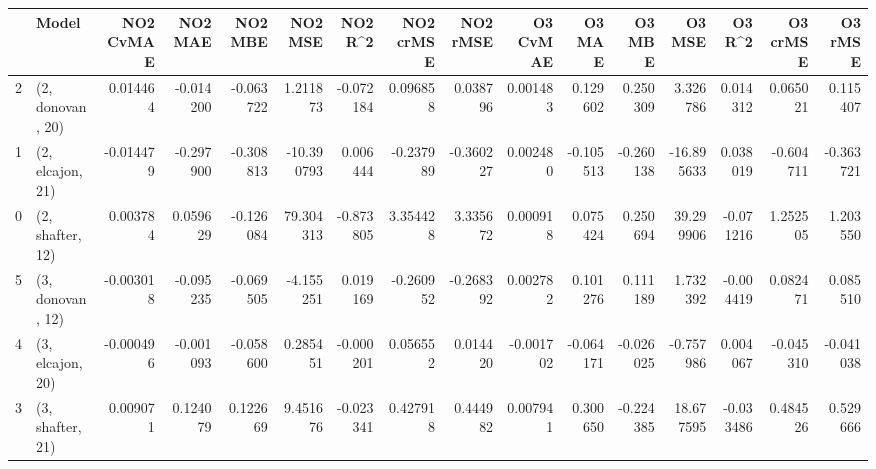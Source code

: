 \begin{tabular}{llrrrrrrrrrrrrrr}
\toprule
{} &             Model &  NO2 CvMAE &   NO2 MAE &   NO2 MBE &    NO2 MSE &   NO2 R\textasciicircum2 &  NO2 crMSE &  NO2 rMSE &  O3 CvMAE &    O3 MAE &    O3 MBE &     O3 MSE &    O3 R\textasciicircum2 &  O3 crMSE &   O3 rMSE \\
\midrule
2 &  (2, donovan, 20) &   0.014464 & -0.014200 & -0.063722 &   1.211873 & -0.072184 &   0.096858 &  0.038796 &  0.001483 &  0.129602 &  0.250309 &   3.326786 &  0.014312 &  0.065021 &  0.115407 \\
1 &  (2, elcajon, 21) &  -0.014479 & -0.297900 & -0.308813 & -10.390793 &  0.006444 &  -0.237989 & -0.360227 &  0.002480 & -0.105513 & -0.260138 & -16.895633 &  0.038019 & -0.604711 & -0.363721 \\
0 &  (2, shafter, 12) &   0.003784 &  0.059629 & -0.126084 &  79.304313 & -0.873805 &   3.354428 &  3.335672 &  0.000918 &  0.075424 &  0.250694 &  39.299906 & -0.071216 &  1.252505 &  1.203550 \\
5 &  (3, donovan, 12) &  -0.003018 & -0.095235 & -0.069505 &  -4.155251 &  0.019169 &  -0.260952 & -0.268392 &  0.002782 &  0.101276 &  0.111189 &   1.732392 & -0.004419 &  0.082471 &  0.085510 \\
4 &  (3, elcajon, 20) &  -0.000496 & -0.001093 & -0.058600 &   0.285451 & -0.000201 &   0.056552 &  0.014420 & -0.001702 & -0.064171 & -0.026025 &  -0.757986 &  0.004067 & -0.045310 & -0.041038 \\
3 &  (3, shafter, 21) &   0.009071 &  0.124079 &  0.122669 &   9.451676 & -0.023341 &   0.427918 &  0.444982 &  0.007941 &  0.300650 & -0.224385 &  18.677595 & -0.033486 &  0.484526 &  0.529666 \\
\bottomrule
\end{tabular}
